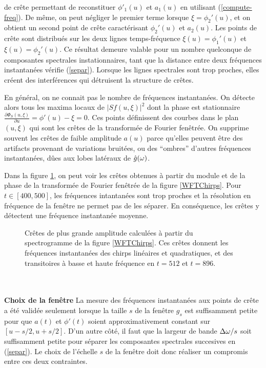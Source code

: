 de cr\^{e}te permettant de reconstituer $\phi'_1	(u)$ et $a_1	(u)$ en 
utilisant (\ref{compute-freq}).
De m\^{e}me, on peut n\'{e}gliger le premier terme lorsque $\xi =	
\phi_2 '(u)$, et on obtient un second point de cr\^{e}te 
caract\'{e}risant $\phi_2 '	(u)$ et $a_2 (u)$. Les points de cr\^{e}te
sont distribu\'{e}s sur les deux lignes temps-fr\'{e}quence $\xi(u)	= \phi_1 ' (u)$
et $\xi(u) = \phi_2	' (u)$. Ce r\'{e}sultat demeure valable pour un 
nombre quelconque de composantes spectrales instationnaires, tant que 
la distance entre deux fr\'{e}quences instantan\'{e}es v\'{e}rifie (\ref{separ}). 
Lorsque les lignes spectrales sont trop proches, elles cr\'{e}ent des 
interf\'{e}rences qui d\'{e}truisent la structure de cr\^{e}tes.

En g\'{e}n\'{e}ral, on ne connait pas le nombre de fr\'{e}quences 
instantan\'{e}es. On d\'{e}tecte alors tous les maxima locaux de 
$|Sf(u,\xi)|^2$ dont la phase est stationnaire 
$\frac {\partial	\Phi_S	(u,\xi )} {\partial	u} = \phi' (u) - \xi = 0$.
Ces points d\'{e}finissent des courbes dans le plan $(u,\xi)$ qui 
sont les cr\^{e}tes de la transform\'{e}e de Fourier fen\^{e}tr\'{e}e. 
On supprime souvent les cr\^{e}tes de faible amplitude $a(u)$ parce 
qu'elles peuvent \^{e}tre des artifacts provenant de variations 
bruit\'{e}es, ou des ``ombres'' d'autres fr\'{e}quences 
instantan\'{e}es, d\^{u}es aux lobes lat\'{e}raux de $\hat g({\omega})$.

Dans la figure \ref{WFTRidgeChirps}, on peut voir les cr\^{e}tes 
obtenues \`{a} partir du module et de la phase de la transform\'{e}e 
de Fourier fen\^{e}tr\'{e}e de la figure \ref{WFTChirps}. Pour $t \in 
[400,500]$, les fr\'{e}quences intantan\'{e}es sont 
trop proches et la r\'{e}solution en fr\'{e}quence de la fen\^{e}tre 
ne permet pas de les s\'{e}parer. En cons\'{e}quence, les cr\^{e}tes y 
d\'{e}tectent une fr\'{e}quence instantan\'{e}e moyenne.

\begin{figure}[bhtp]
\centerline{
        \epsfxsize=8cm
        \leavevmode{}}
\caption{
Cr\^{e}tes de plus grande amplitude calcul\'{e}es \`{a} partir du 
spectrogramme de la figure \protect\ref{WFTChirps}. Ces cr\^{e}tes 
donnent les fr\'{e}quences instantan\'{e}es des chirps lin\'{e}aires et 
quadratiques, et des transitoires \`{a} basse et haute fr\'{e}quence 
en  $t=512$ et $t=896$.
}
\label{WFTRidgeChirps}
\end{figure}
\\
\\
\noindent
{\bf Choix de	la fen\^{e}tre}
La mesure des fr\'{e}quences instantan\'{e}es 
aux points de cr\^{e}te 
a \'{e}t\'{e} valid\'{e}e seulement lorsque la taille $s$ de la 
fen\^{e}tre $g_s$ est suffisamment petite pour que
$a(t)$ et $\phi' (t)$ soient approximativement
constant sur $[u-s/2,u+s/2]$. 
D'un autre c\^{o}t\'{e}, il faut que la largeur de 
bande ${\Delta {\omega}}/ s$ soit 
suffisamment petite pour s\'{e}parer les composantes 
spectrales succesives en (\ref{separ}). Le choix de l'\'{e}chelle $s$ de la 
fen\^{e}tre  doit donc r\'{e}aliser un compromis entre ces deux 
contraintes.

